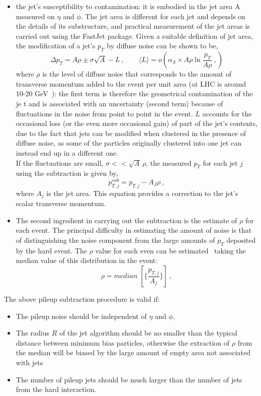 \begin{itemize}
\item the jet’s susceptibility to contamination: it is embodied in the jet area A measured on $\eta$ and $\phi$. The jet area is different for each jet and depends on the details of its substructure, and practical measurement of the jet areas is carried out using the FastJet package. 
Given a suitable definition of jet area, the modification of a jet’s $p_T$ by diffuse noise can be shown to be,
\begin{equation} 
\Delta p_T=A\rho \pm \sigma \sqrt{A} -L \:, \qquad \langle L \rangle=o(\alpha_S \times A \rho \ln \frac{p_T}{ A \rho} \:,  )
\end{equation} 
where $\rho$ is the level of diffuse noise that  corresponds to the amount of transverse momentum added to the event per unit area (at LHC is around 
10-20 GeV~\cite{Sjostrand:2003wg}): the first term is therefore the geometrical contamination of the je
t and is associated with an uncertainty (second term) because of fluctuations in the noise from point to point in the event.
$L$  accounts for the occasional loss (or the even more occasional gain) of part of the jet’s contents,
due to the fact that jets can be modified when clustered in the presence of diffuse noise, as some
of the particles originally clustered into one jet can instead end up in a different one. \\
If the fluctuations are small, $\sigma << \sqrt{A} \, \rho$, the measured $p_T$ for each jet $j$ using the subtraction is given by,
\begin{equation} 
p_{T,j}^{sub}=p_{T,j} -A_J \rho \: ,
\end{equation} 
where $A_j $ is the jet area. This equation provides a correction to the jet’s scalar transverse
momentum.
\item The second ingredient in carrying out the subtraction is the estimate of $\rho$ for each event.
The principal difficulty in estimating the amount of noise is that of distinguishing the noise component from the large amounts of $p_T$ deposited by the hard event.
The $\rho$ value  for each even can be estimated~\cite{Cacciari:2007fd}  taking the median value of this distribution in the event: 
\begin{equation} 
\rho= median \; [\{\frac{p_{T,j}}{A_j}\}]  \: ,
\end{equation} 
\end{itemize}
The above pileup subtraction procedure is valid if: 
\begin{itemize}
\item The pileup noise should be independent of $\eta$ and $\phi$.
\item The radius $R$ of the jet algorithm should be no smaller than the typical distance between minimum bias particles, otherwise the extraction of
 $\rho$ from the median will be biased by the large amount of empty area not associated with jets
\item The number of pileup jets should be much larger than the number of jets from the hard interaction. 
\end{itemize}



